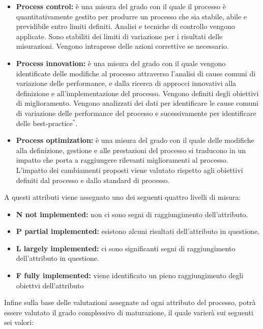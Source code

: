 \begin{itemize}
	\item \textbf{Process control:} è una misura del grado con il quale il processo è quantitativamente gestito per produrre un processo che sia stabile, abile e previdibile entro limiti definiti. Analisi e tecniche di controllo vengono applicate. Sono stabiliti dei limiti di variazione per i risultati delle misurazioni. Vengono intraprese delle azioni correttive se necessario. 
	\item \textbf{Process innovation:} è una misura del grado con il quale vengono identificate delle modifiche al processo attraverso l'analisi di cause comuni di variazione delle performance, e dalla ricerca di approcci innovativi alla definizione e all'implementazione del processo. Vengono definiti degli obiettivi di miglioramento. Vengono analizzati dei dati per identificare le cause comuni di variazione delle performance del processo e sucessivamente per identificare delle best-practice$^*$.
	\item \textbf{Process optimization:} è una misura del grado con il quale delle modifiche alla definizione, gestione e alle prestazioni del processo si traducono in un impatto che porta a raggiungere rilevanti miglioramenti al processo. L'impatto dei cambiamenti proposti viene valutato rispetto agli obiettivi definiti dal processo e dallo standard di processo.
	\end{itemize}
	A questi attributi viene assegnato uno dei seguenti quattro livelli di misura:
	\begin{itemize}
	\item \textbf{N not implemented:} non ci sono segni di raggiungimento dell'attributo.
	\item \textbf{P partial implemented:} esistono alcuni risultati dell'attributo in questione.
	\item \textbf{L largely implemented:} ci sono significanti segni di raggiungimento dell'attributo in questione.
	\item \textbf{F fully implemented:} viene identificato un pieno raggiungimento degli obiettvi dell'attributo
	\end{itemize}
	Infine sulla base delle valutazioni assegnate ad ogni attributo del processo, potrà essere valutato il grado complessivo di maturazione, il quale varierà sui seguenti sei valori:
